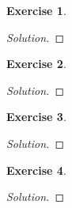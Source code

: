 \documentclass[12pt,a4]{article}
\theoremstyle{definition}
\newtheorem{exercise}{Exercise}
\begin{document}
\begin{exercise}
	
\end{exercise}
\begin{proof}[Solution]
	
\end{proof}

\begin{exercise}
	
\end{exercise}
\begin{proof}[Solution]
	
\end{proof}

\begin{exercise}
	
\end{exercise}
\begin{proof}[Solution]
	
\end{proof}

\begin{exercise}
	
\end{exercise}
\begin{proof}[Solution]
	
\end{proof}
\end{document}

